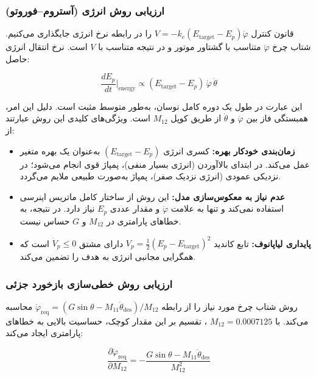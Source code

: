 \subsubsection{ارزیابی روش انرژی (آستروم–فوروتو)}

قانون کنترل $V = -k_e(E_{\text{target}} - E_p)\dot\varphi$ را در رابطه نرخ انرژی جایگذاری می‌کنیم. شتاب چرخ $\ddot\varphi$ متناسب با گشتاور موتور و در نتیجه متناسب با $V$ است. نرخ انتقال انرژی حاصل:

\begin{equation}
    \frac{dE_p}{dt}\bigg|_{\text{energy}} \propto (E_{\text{target}} - E_p)\,\dot\varphi\,\dot\theta
\end{equation}

این عبارت در طول یک دوره کامل نوسان، به‌طور متوسط مثبت است. دلیل این امر، همبستگی فاز بین $\dot\varphi$ و $\dot\theta$ از طریق کوپل $M_{12}$ است. ویژگی‌های کلیدی این روش عبارتند از:

\begin{itemize}
    \item \textbf{زمان‌بندی خودکار بهره:} کسری انرژی $(E_{\text{target}} - E_p)$ به‌عنوان یک بهره متغیر عمل می‌کند. در ابتدای بالاآوردن (انرژی بسیار منفی)، پمپاژ قوی انجام می‌شود؛ در نزدیکی عمودی (انرژی نزدیک صفر)، پمپاژ به‌صورت طبیعی ملایم می‌گردد.
    \item \textbf{عدم نیاز به معکوس‌سازی مدل:} این روش از ساختار کامل ماتریس اینرسی استفاده نمی‌کند و تنها به علامت $\dot\varphi$ و مقدار عددی $E_p$ نیاز دارد. در نتیجه، به خطاهای پارامتری در $M_{12}$ و $G$ حساس نیست.
    \item \textbf{پایداری لیاپانوف:} تابع کاندید $V_p = \tfrac{1}{2}(E_p - E_{\text{target}})^2$ دارای مشتق $\dot{V}_p \leq 0$ است که همگرایی مجانبی انرژی به هدف را تضمین می‌کند.
\end{itemize}

\subsubsection{ارزیابی روش خطی‌سازی بازخورد جزئی}

روش  شتاب چرخ مورد نیاز را از رابطه $\ddot\varphi_{\text{req}} = (G\sin\theta - M_{11}\ddot\theta_{\text{des}})/M_{12}$ محاسبه می‌کند. با $M_{12} = 0.0007125$ ، تقسیم بر این مقدار کوچک، حساسیت بالایی به خطاهای پارامتری ایجاد می‌کند:

\begin{equation}
    \frac{\partial \ddot\varphi_{\text{req}}}{\partial M_{12}} = -\frac{G\sin\theta - M_{11}\ddot\theta_{\text{des}}}{M_{12}^2}
\end{equation}

